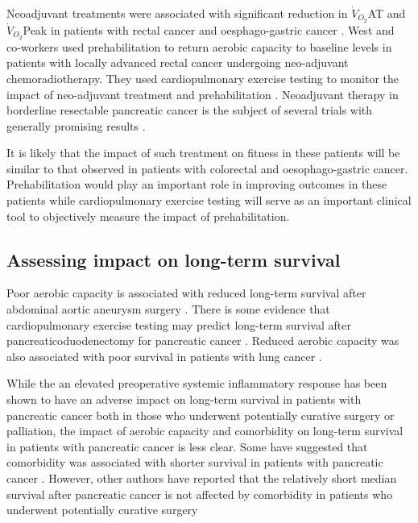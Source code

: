 Neoadjuvant treatments were associated with significant reduction in $\dot{V}_{O_2}$AT and $\dot{V}_{O_2}$Peak in patients with rectal cancer \parencite{west_effects_2014} and oesphago-gastric cancer \parencite{jack_effect_2014}.
West and co-workers used prehabilitation to return aerobic capacity to baseline levels in patients with locally advanced rectal cancer undergoing neo-adjuvant chemoradiotherapy.
They used cardiopulmonary exercise testing to monitor the impact of neo-adjuvant treatment and prehabilitation \parencite{west_effect_2015}.
Neoadjuvant therapy in borderline resectable pancreatic cancer is the subject of several trials with generally promising results \parencite{evans_preoperative_2008, gillen_preoperative/neoadjuvant_2010, golcher_neoadjuvant_2015, kim_multi-institutional_2013, sahora_phase_2014}.

It is likely that the impact of such treatment on fitness in these patients will be similar to that observed in patients with colorectal and oesophago-gastric cancer.
Prehabilitation would play an important role in improving outcomes in these patients while cardiopulmonary exercise testing will serve as an important clinical tool to objectively measure the impact of prehabilitation.

\subsection{Assessing impact on long-term survival}

Poor aerobic capacity is associated with reduced long-term survival after abdominal aortic aneurysm surgery \parencite{tang_cardiopulmonary_2012, grant_cardiopulmonary_2015}.
There is some evidence that cardiopulmonary exercise testing may predict long-term survival after pancreaticoduodenectomy for pancreatic cancer \parencite{junejo_cardiopulmonary_2014}.
Reduced aerobic capacity was also associated with poor survival in patients with lung cancer \parencite{jones_peak_2010}.

While the an elevated preoperative systemic inflammatory response has been shown to have an adverse impact on long-term survival in patients with pancreatic cancer both in those who underwent potentially curative surgery or palliation, the impact of aerobic capacity and comorbidity on long-term survival in patients with pancreatic cancer is less clear.
Some have suggested that comorbidity was associated with shorter survival in patients with pancreatic cancer \parencite{dias-santos_charlson_2015}.
However, other authors have reported that the relatively short median survival after pancreatic cancer is not affected by comorbidity in patients who underwent potentially curative surgery \parencite{kos_evaluation_2014}

